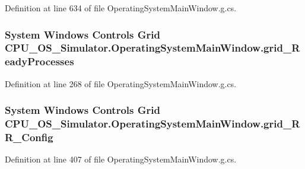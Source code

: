 Definition at line 634 of file Operating\+System\+Main\+Window.\+g.\+cs.

\hypertarget{class_c_p_u___o_s___simulator_1_1_operating_system_main_window_a4dc7b1233f61261fad09e145e63563a3}{}
\subsubsection[{grid\+\_\+\+Ready\+Processes}]{\setlength{\rightskip}{0pt plus 5cm}System Windows Controls Grid C\+P\+U\+\_\+\+O\+S\+\_\+\+Simulator.\+Operating\+System\+Main\+Window.\+grid\+\_\+\+Ready\+Processes\hspace{0.3cm}{\ttfamily [package]}}\label{class_c_p_u___o_s___simulator_1_1_operating_system_main_window_a4dc7b1233f61261fad09e145e63563a3}


Definition at line 268 of file Operating\+System\+Main\+Window.\+g.\+cs.

\hypertarget{class_c_p_u___o_s___simulator_1_1_operating_system_main_window_a626ad676e978db5c0d52825764e68ea5}{}
\subsubsection[{grid\+\_\+\+R\+R\+\_\+\+Config}]{\setlength{\rightskip}{0pt plus 5cm}System Windows Controls Grid C\+P\+U\+\_\+\+O\+S\+\_\+\+Simulator.\+Operating\+System\+Main\+Window.\+grid\+\_\+\+R\+R\+\_\+\+Config\hspace{0.3cm}{\ttfamily [package]}}\label{class_c_p_u___o_s___simulator_1_1_operating_system_main_window_a626ad676e978db5c0d52825764e68ea5}


Definition at line 407 of file Operating\+System\+Main\+Window.\+g.\+cs.

